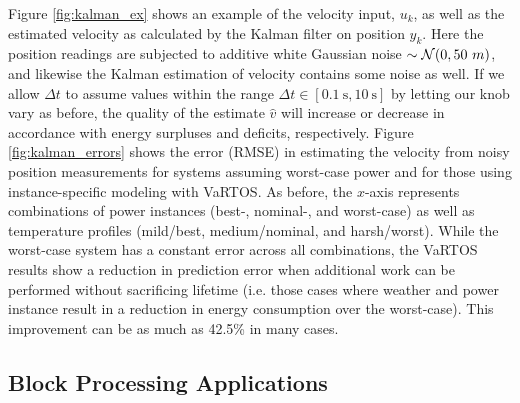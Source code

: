 Figure \ref{fig:kalman_ex} shows an example of the velocity input, $u_k$, as well as the estimated velocity as calculated by the Kalman filter on position $y_k$. Here the position readings are subjected to additive white Gaussian noise $\sim {\mathcal{N}}(0, 50~m)$, and likewise the Kalman estimation of velocity contains some noise as well.  If we allow $\Delta t$ to assume values within the range $\Delta t \in [0.1~\text{s}, 10~\text{s}]$ by letting our knob vary as before, the quality of the estimate $\hat{v}$ will increase or decrease in accordance with energy surpluses and deficits, respectively.  Figure \ref{fig:kalman_errors} shows the error (RMSE) in estimating the velocity from noisy position measurements for systems assuming worst-case power and for those using instance-specific modeling with VaRTOS.  As before, the $x$-axis represents combinations of power instances (best-, nominal-, and worst-case) as well as temperature profiles (mild/best, medium/nominal, and harsh/worst). While the worst-case system has a constant error across all combinations, the VaRTOS results show a reduction in prediction error when additional work can be performed without sacrificing lifetime (i.e. those cases where weather and power instance result in a reduction in energy consumption over the worst-case). This improvement can be as much as 42.5\% in many cases. 


%


\subsection{Block Processing Applications}

